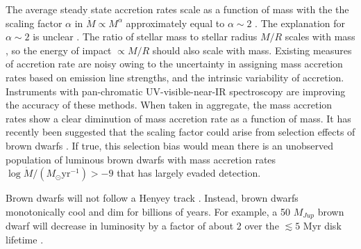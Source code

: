 The average steady state accretion rates scale as a function of mass with the the scaling factor $\alpha$ in $\dot{M}\propto M^\alpha$ approximately equal to $\alpha \sim 2$ \citep{2008A&A...481..423G,2006ApJ...639L..83A,2006A&A...452..245N,2009ApJ...696.1589H}.  The explanation for $\alpha \sim 2$ is unclear \citep{2006ApJ...648..484H}.  The ratio of stellar mass to stellar radius $M/R$ scales with mass \citep{2009AIPC.1094..102C}, so the energy of impact $\propto M/R$ should also scale with mass.  Existing measures of accretion rate are noisy owing to the uncertainty in assigning mass accretion rates based on emission line strengths, and the intrinsic variability of accretion.  Instruments with pan-chromatic UV-visible-near-IR spectroscopy \citep{2011A&A...536A.105V,2012A&A...548A..56R} are improving the accuracy of these methods.  When taken in aggregate, the mass accretion rates show a clear diminution of mass accretion rate as a function of mass.  It has recently been suggested that the scaling factor could arise from selection effects of brown dwarfs \citep{2010MNRAS.409.1307M}.  If true, this selection bias would mean there is an unobserved population of luminous brown dwarfs with mass accretion rates $\log{\dot{M}/(M_{\odot}\mathrm{yr}^{-1})} >-9$ that has largely evaded detection.

Brown dwarfs will not follow a Henyey track \citep{1959ApJ...129....2H}.  Instead, brown dwarfs monotonically cool and dim for billions of years.  For example, a 50 $M_{Jup}$ brown dwarf will decrease in luminosity by a factor of about 2 over the $\lesssim5$ Myr disk lifetime \citep{2002A&A...382..563B}.

